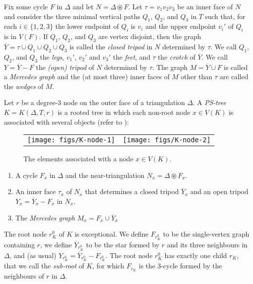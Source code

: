 \documentclass{patmorin}
\begin{document}
Fix some cycle $F$ in $\Delta$ and let $N=\Delta\circledast F$.
Let $\tau=v_1v_2v_3$ be an inner face of $N$ and consider the three minimal vertical paths $Q_1$, $Q_2$, and $Q_3$ in $T$ such that, for each $i\in\{1,2,3\}$ the lower endpoint of $Q_i$ is $v_i$ and the upper endpoint $v_i'$ of $Q_i$ is in $V(F)$.  If $Q_1$, $Q_2$, and $Q_3$ are vertex disjoint, then the graph $\overline{Y}=\tau\cup Q_1\cup Q_2\cup Q_3$ is called the \emph{closed tripod} in $N$ determined by $\tau$.  We call $Q_1$, $Q_2$, and $Q_3$ the \emph{legs}, $v_1'$, $v_2'$ and $v_3'$ the \emph{feet}, and $\tau$ the \emph{crotch} of $\overline{Y}$.  We call $Y=\overline{Y}-F$ the \emph{(open) tripod} of $N$ determined by $\tau$.  The graph $M=\overline{Y}\cup F$ is called a \emph{Mercedes graph} and the (at most three) inner faces of $M$ other than $\tau$ are called the \emph{wedges} of $M$.

Let $r$ be a degree-3 node on the outer face of a triangulation $\Delta$.  A \emph{PS-tree}  $K=K(\Delta, T, r)$ is a rooted tree in which each non-root node $x\in V(K)$ is associated with several objects (refer to ):

\begin{figure}
  \begin{center}
    \begin{tabular}{cc}
      \texttt{[image: figs/K-node-1]} &
      \texttt{[image: figs/K-node-2]}
    \end{tabular}
  \end{center}
  \caption{The elements associated with a node $x\in V(K)$.}
\end{figure}

\begin{enumerate}
  \item A cycle $F_x$ in $\Delta$ and the near-triangulation $N_x=\Delta\circledast F_x$.
  
  \item An inner face $\tau_x$ of $N_x$ that determines a closed tripod $\overline{Y}_x$ and an open tripod $Y_x=\overline{Y}_x-F_x$ in $N_x$.
  
  \item The \emph{Mercedes graph} $M_x=F_x\cup \overline{Y}_x$
\end{enumerate}

The root node $r^0_K$ of $K$ is exceptional.  We define $F_{r^0_K}$ to be the single-vertex graph containing $r$, we define $\overline{Y}_{r^0_K}$ to be the star formed by $r$ and its three neighbours in $\Delta$, and (as usual) $Y_{r^0_K}=\overline{Y}_{r^0_K}-F_{r^0_K}$.  The root node $r^0_K$ has exactly one child $r_K$, that we call the \emph{sub-root} of $K$, for which $F_{r_K}$ is the 3-cycle formed by the neighbours of $r$ in $\Delta$.
\end{document}
